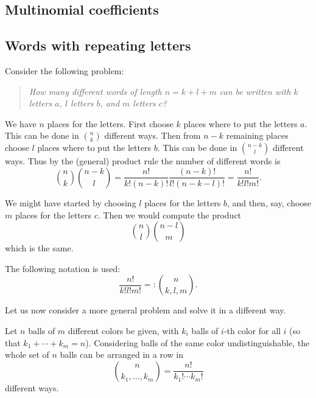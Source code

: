 \begin{page}

\section{Multinomial coefficients}
\subsection{Words with repeating letters}
Consider the following problem:
\begin{quote}
\emph{How many different words of length $n=k+l+m$ can be written with $k$ letters $a$, $l$ letters $b$, and $m$ letters $c$?}
\end{quote}

We have $n$ places for the letters.
First choose $k$ places where to put the letters $a$.
This can be done in $\binom{n}{k}$ different ways.
Then from $n-k$ remaining places choose $l$ places where to put the letters $b$.
This can be done in $\binom{n-k}{l}$ different ways.
Thus by the (general) product rule the number of different words is
\[
\binom{n}{k} \binom{n-k}{l} = \frac{n!}{k!(n-k)!} \frac{(n-k)!}{l!(n-k-l)!} = \frac{n!}{k!l!m!}.
\]

We might have started by choosing $l$ places for the letters $b$, and then, say, choose $m$ places for the letters $c$.
Then we would compute the product
\[
\binom{n}{l} \binom{n-l}{m}
\]
which is the same.

The following notation is used:
\[
\frac{n!}{k!l!m!} =: \binom{n}{k, l, m}.
\]

Let us now consider a more general problem and solve it in a different way.


\end{page}

\begin{page}

\begin{thm}
Let $n$ balls of $m$ different colors be given, with $k_i$ balls of $i$-th color for all $i$ (so that $k_1 + \cdots + k_m = n$).
Considering balls of the same color undistinguishable, the whole set of $n$ balls can be arranged in a row in
\[
\binom{n}{k_1, \ldots, k_m} = \frac{n!}{k_1! \cdots k_m!}
\]
different ways.
\end{thm}

\end{page}

